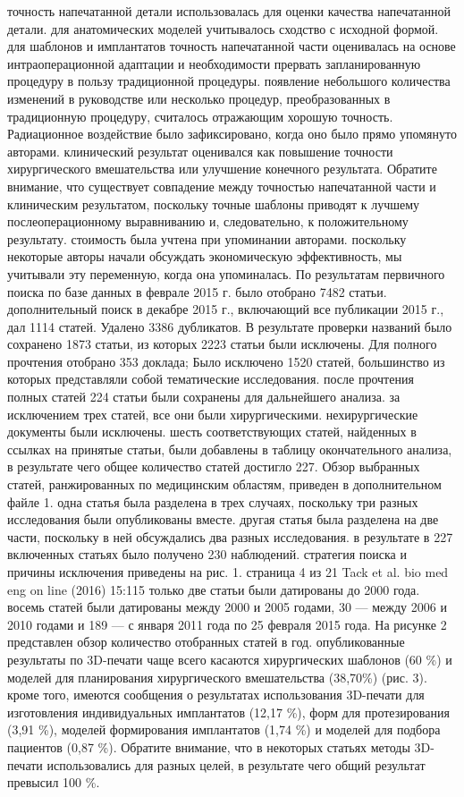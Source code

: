 точность напечатанной детали использовалась для оценки качества напечатанной
детали. для анатомических моделей учитывалось сходство с исходной формой. для
шаблонов и имплантатов точность напечатанной части оценивалась на основе
интраоперационной адаптации и необходимости прервать запланированную процедуру в
пользу традиционной процедуры. появление небольшого количества изменений в
руководстве или несколько процедур, преобразованных в традиционную процедуру,
считалось отражающим хорошую точность. Радиационное воздействие было
зафиксировано, когда оно было прямо упомянуто авторами. клинический результат
оценивался как повышение точности хирургического вмешательства или улучшение
конечного результата. Обратите внимание, что существует совпадение между
точностью напечатанной части и клиническим результатом, поскольку точные шаблоны
приводят к лучшему послеоперационному выравниванию и, следовательно, к
положительному результату. стоимость была учтена при упоминании авторами.
поскольку некоторые авторы начали обсуждать экономическую эффективность, мы
учитывали эту переменную, когда она упоминалась. По результатам первичного
поиска по базе данных в феврале 2015 г. было отобрано 7482 статьи.
дополнительный поиск в декабре 2015 г., включающий все публикации 2015 г., дал
1114 статей. Удалено 3386 дубликатов. В результате проверки названий было
сохранено 1873 статьи, из которых 2223 статьи были исключены. Для полного
прочтения отобрано 353 доклада; Было исключено 1520 статей, большинство из
которых представляли собой тематические исследования. после прочтения полных
статей 224 статьи были сохранены для дальнейшего анализа. за исключением трех
статей, все они были хирургическими. нехирургические документы были исключены.
шесть соответствующих статей, найденных в ссылках на принятые статьи, были
добавлены в таблицу окончательного анализа, в результате чего общее количество
статей достигло 227. Обзор выбранных статей, ранжированных по медицинским
областям, приведен в дополнительном файле 1. одна статья была разделена в трех
случаях, поскольку три разных исследования были опубликованы вместе. другая
статья была разделена на две части, поскольку в ней обсуждались два разных
исследования. в результате в 227 включенных статьях было получено 230
наблюдений. стратегия поиска и причины исключения приведены на рис. 1. страница
4 из 21 Tack et al. bio med eng on line (2016) 15:115 только две статьи были
датированы до 2000 года. восемь статей были датированы между 2000 и 2005 годами,
30 — между 2006 и 2010 годами и 189 — с января 2011 года по 25 февраля 2015
года. На рисунке 2 представлен обзор количество отобранных статей в год.
опубликованные результаты по 3D-печати чаще всего касаются хирургических
шаблонов (60 \%) и моделей для планирования хирургического вмешательства 
(38,70\%) (рис. 3). кроме того, имеются сообщения о результатах использования 
3D-печати для изготовления индивидуальных имплантатов (12,17 \%), форм для 
протезирования (3,91 \%), моделей формирования имплантатов (1,74 \%) и моделей 
для подбора
пациентов (0,87 \%). Обратите внимание, что в некоторых статьях методы
3D-печати использовались для разных целей, в результате чего общий
результат превысил 100 \%.

